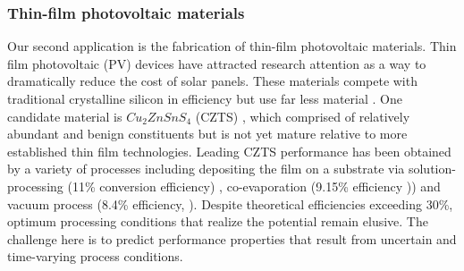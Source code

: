 \documentclass[11pt]{article}
\begin{document}

\subsubsection*{Thin-film photovoltaic materials}
Our second  application 
is the fabrication of thin-film photovoltaic
materials. 
Thin film photovoltaic (PV) devices have attracted research attention
as a way to dramatically reduce the cost of solar panels. These
materials compete with traditional crystalline silicon in efficiency but use far less
material \cite{JiangY13}. 
One candidate material is $Cu_2ZnSnS_4$ (CZTS) \cite{JiangY13}, which
comprised of relatively abundant and benign constituents but is not yet mature relative to more established thin film technologies. 
Leading  CZTS  performance has been obtained by a variety of processes including depositing the film on a substrate via
solution-processing (11\% conversion efficiency) \cite{Todorov13},
co-evaporation (9.15\% efficiency \cite{Repins12})) and vacuum
process (8.4\% efficiency, \cite{Shin11}). Despite theoretical
efficiencies exceeding 30\%,  optimum processing conditions
that realize the potential remain elusive.
The challenge here is to 
predict performance properties that result from uncertain and time-varying process
conditions.
\end{document}

